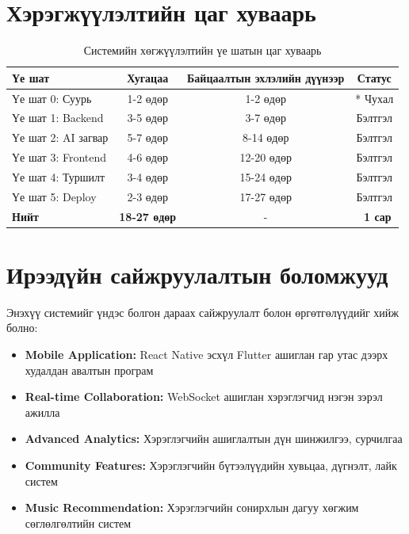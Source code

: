 \section{Хэрэгжүүлэлтийн цаг хуваарь}

\begin{table}[!htbp]
\caption{Системийн хөгжүүлэлтийн үе шатын цаг хуваарь}
\centering
\begin{tabular}{|l|c|c|c|}
\hline
\textbf{Үе шат} & \textbf{Хугацаа} & \textbf{Байцаалтын эхлэлийн дүүнээр} & \textbf{Статус} \\
\hline
Үе шат 0: Суурь & 1-2 өдөр & 1-2 өдөр & * Чухал \\
\hline
Үе шат 1: Backend & 3-5 өдөр & 3-7 өдөр & Бэлтгэл \\
\hline
Үе шат 2: AI загвар & 5-7 өдөр & 8-14 өдөр & Бэлтгэл \\
\hline
Үе шат 3: Frontend & 4-6 өдөр & 12-20 өдөр & Бэлтгэл \\
\hline
Үе шат 4: Туршилт & 3-4 өдөр & 15-24 өдөр & Бэлтгэл \\
\hline
Үе шат 5: Deploy & 2-3 өдөр & 17-27 өдөр & Бэлтгэл \\
\hline
\textbf{Нийт} & \textbf{18-27 өдөр} & - & \textbf{~1 сар} \\
\hline
\end{tabular}
\end{table}

\section{Ирээдүйн сайжруулалтын боломжууд}

Энэхүү системийг үндэс болгон дараах сайжруулалт болон өргөтгөлүүдийг хийж болно:

\begin{itemize}
    \item \textbf{Mobile Application:} React Native эсхүл Flutter ашиглан гар утас дээрх худалдан авалтын програм
    
    \item \textbf{Real-time Collaboration:} WebSocket ашиглан хэрэглэгчид нэгэн зэрэл ажилла
    
    \item \textbf{Advanced Analytics:} Хэрэглэгчийн ашиглалтын дүн шинжилгээ, сурчилгаа
    
    \item \textbf{Community Features:} Хэрэглэгчийн бүтээлүүдийн хувьцаа, дүгнэлт, лайк систем
    
    \item \textbf{Music Recommendation:} Хэрэглэгчийн сонирхлын дагуу хөгжим сөглөлгөлтийн систем
\end{itemize}

